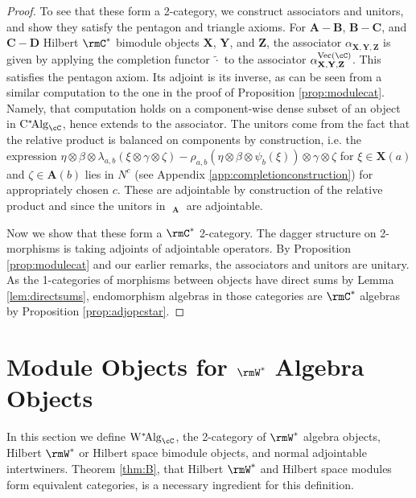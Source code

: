 \documentclass[11pt,reqno]{amsart}
\DeclareMathOperator{\Vect}{Vec}
\DeclareMathOperator{\CMod}{C^*Mod}
\DeclareMathOperator{\CAlg}{C^*\!Alg}
\DeclareMathOperator{\WAlg}{W^*\!Alg}
\newcommand{\bb}[1]{\mathbf{#1}}
\numberwithin{equation}{section}
\theoremstyle{plain}
\begin{document}
\begin{proof}
To see that these form a 2-category, we construct associators and unitors, and show they satisfy the pentagon and triangle axioms.
For $\bb A-\bb B$, $\bb B-\bb C$, and $\bb C-\bb D$ Hilbert $\rmC^*$ bimodule objects $\bb X$, $\bb Y$, and $\bb Z$, the associator $\alpha_{\bb X, \bb Y, \bb Z}$ is given by applying the completion functor $\widetilde{\cdot}$ to the associator $\alpha_{\bb X, \bb Y, \bb Z}^{\Vect(\cC)}$.
This satisfies the pentagon axiom.
Its adjoint is its inverse, as can be seen from a similar computation to the one in the proof of Proposition \ref{prop:modulecat}.
Namely, that computation holds on a component-wise dense subset of an object in $\CAlg_{\cC}$, hence extends to the associator.
The unitors come from the fact that the relative product is balanced on components by construction, i.e. the expression $\eta \otimes \beta \otimes \lambda_{a, b}(\xi \otimes \gamma \otimes \zeta) - \rho_{a, b}(\eta \otimes \beta \otimes \psi_b(\xi)) \otimes \gamma \otimes \zeta$ for $\xi \in \bb X(a)$ and $\zeta \in \bb A(b)$ lies in $N^c$ (see Appendix \ref{app:completionconstruction}) for appropriately chosen $c$.
These are adjointable by construction of the relative product and since the unitors in $\CMod_{\bb A}$ are adjointable.

Now we show that these form a $\rmC^*$ 2-category.
The dagger structure on 2-morphisms is taking adjoints of adjointable operators.
By Proposition \ref{prop:modulecat} and our earlier remarks, the associators and unitors are unitary.
As the 1-categories of morphisms between objects have direct sums by Lemma \ref{lem:directsums}, endomorphism algebras in those categories are $\rmC^*$ algebras by Proposition \ref{prop:adjopcstar}.
\end{proof}

\section{Module Objects for $\rmW^*$ Algebra Objects} \label{section:WModObjs}
In this section we define $\WAlg_{\cC}$, the 2-category of $\rmW^*$ algebra objects, Hilbert $\rmW^*$ or Hilbert space bimodule objects, and normal adjointable intertwiners.
Theorem \ref{thm:B}, that Hilbert $\rmW^*$ and Hilbert space modules form equivalent categories, is a necessary ingredient for this definition.
\end{document}
